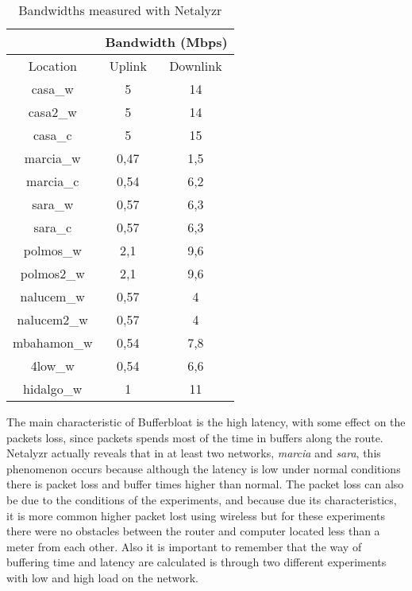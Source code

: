 \begin{table}[ht]
\begin{center}
\begin{tabular}{|c||c|c||}
 \hline
 & \multicolumn{2}{|c||}{Bandwidth (Mbps)} \\ \hline 
Location 	& Uplink & Downlink			   \\ \hline \hline
casa\_w		& 5		 & 14 				   \\ \hline
casa2\_w	& 5		 & 14 			   	   \\ \hline
casa\_c		& 5		 & 15 			       \\ \hline
marcia\_w	& 0,47	 & 1,5 			   	   \\ \hline
marcia\_c	& 0,54	 & 6,2 			   	   \\ \hline
sara\_w		& 0,57	 & 6,3 			   	   \\ \hline
sara\_c		& 0,57	 & 6,3 			   	   \\ \hline
polmos\_w	& 2,1	 & 9,6 			   	   \\ \hline
polmos2\_w	& 2,1	 & 9,6 			   	   \\ \hline
nalucem\_w	& 0,57	 & 4 			   	   \\ \hline
nalucem2\_w	& 0,57	 & 4 			   	   \\ \hline
mbahamon\_w	& 0,54	 & 7,8 			   	   \\ \hline
4low\_w		& 0,54	 & 6,6 			   	   \\ \hline
hidalgo\_w	& 1		 & 11 			   	   \\ \hline
\end{tabular}
\caption[Netalyrz Test: Bandwidth]{Bandwidths measured with Netalyzr}
\label{table:Bandwidth}
\end{center}
\end{table}


The main characteristic of Bufferbloat is the high latency, with some effect
on the packets loss, since packets spends most of the time in buffers along
the route. Netalyzr actually reveals that in at least two networks,
\textit{marcia} and \textit{sara}, this phenomenon occurs because although the
latency is low under normal conditions there is packet loss and buffer times
higher than normal. The packet loss can also be due to the conditions of the
experiments, and because due its characteristics, it is more common higher
packet lost using wireless but for these experiments there were no obstacles
between the router and computer located less than a meter from each other. Also
it is important to remember that the way of buffering time and latency are
calculated is through two different experiments with low and high load on the
network.

